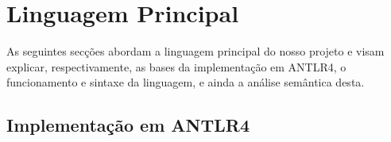 \documentclass[10pt,portuguese]{article}
\begin{document}
\newpage
\section{Linguagem Principal}

\par As seguintes secções abordam a linguagem principal do nosso projeto e visam explicar, respectivamente, as bases da implementação em ANTLR4, o funcionamento e sintaxe da linguagem, e ainda a análise semântica desta.

\subsection{Implementação em ANTLR4}
\end{document}
